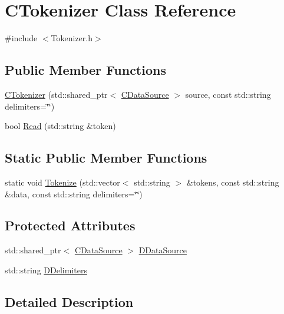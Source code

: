 \hypertarget{classCTokenizer}{}\section{C\+Tokenizer Class Reference}
\label{classCTokenizer}


{\ttfamily \#include $<$Tokenizer.\+h$>$}

\subsection*{Public Member Functions}
\begin{DoxyCompactItemize}
\item 
\hyperlink{classCTokenizer_abb6403c9fb2fe0e5d2a4349d7bcbf3ef}{C\+Tokenizer} (std\+::shared\+\_\+ptr$<$ \hyperlink{classCDataSource}{C\+Data\+Source} $>$ source, const std\+::string delimiters=\char`\"{}\char`\"{})
\item 
bool \hyperlink{classCTokenizer_ab3afe12900a14497129426e46d9f65d9}{Read} (std\+::string \&token)
\end{DoxyCompactItemize}
\subsection*{Static Public Member Functions}
\begin{DoxyCompactItemize}
\item 
static void \hyperlink{classCTokenizer_a7477f6849a3d0a5154879d8622e4012c}{Tokenize} (std\+::vector$<$ std\+::string $>$ \&tokens, const std\+::string \&data, const std\+::string delimiters=\char`\"{}\char`\"{})
\end{DoxyCompactItemize}
\subsection*{Protected Attributes}
\begin{DoxyCompactItemize}
\item 
std\+::shared\+\_\+ptr$<$ \hyperlink{classCDataSource}{C\+Data\+Source} $>$ \hyperlink{classCTokenizer_aaa6faab432000d3f942a0c14fc09f60b}{D\+Data\+Source}
\item 
std\+::string \hyperlink{classCTokenizer_ad1edcf297f5f9ccf43dc32a992556f52}{D\+Delimiters}
\end{DoxyCompactItemize}


\subsection{Detailed Description}


